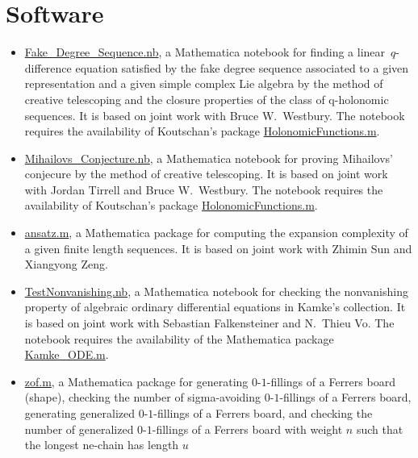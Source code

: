 \documentclass[a4paper,12pt]{article}
\begin{document}
\section*{\Large{Software}}
\begin{itemize}
\item \href{https://yzhang1616.github.io/fd/Fake_Degree_Sequence.nb}{Fake\_Degree\_Sequence.nb},  a Mathematica notebook for finding a linear~$q$-difference equation satisfied by the fake degree sequence associated to a given representation and a given simple complex Lie algebra by the method of creative telescoping and the closure properties of the class of q-holonomic sequences.  It is based on joint work
    with Bruce W.\ Westbury.  The notebook requires the availability of Koutschan's package 
 \href{http://www.risc.jku.at/research/combinat/software/ergosum/RISC/HolonomicFunctions.html}{HolonomicFunctions.m}.
\item \href{https://yzhang1616.github.io/ct/Mihailovs_Conjecture.nb}{Mihailovs\_Conjecture.nb},  a Mathematica notebook for 
proving Mihailovs' conjecure by the method of creative telescoping. It is based on joint work
with Jordan Tirrell and Bruce W.\ Westbury.   The notebook requires the availability of Koutschan's package 
 \href{http://www.risc.jku.at/research/combinat/software/ergosum/RISC/HolonomicFunctions.html}{HolonomicFunctions.m}.
\item \href{https://yzhang1616.github.io/complexity/ansatz.m}{ansatz.m}, 
a Mathematica package for computing the expansion complexity of a given finite length sequences. 
It is based on joint work with Zhimin Sun and Xiangyong Zeng. 
  \item \href{https://yzhang1616.github.io/TestNonvanishing.nb}{TestNonvanishing.nb}, 
    a Mathematica notebook for checking the nonvanishing property of algebraic ordinary
    differential equations in Kamke's collection. It is based on joint work
    with Sebastian Falkensteiner and N.\ Thieu Vo. 
    The notebook requires the availability of the Mathematica package \href{https://yzhang1616.github.io/Kamke_ODE.m}{Kamke\_ODE.m}.
  \item \href{https://yzhang1616.github.io/zof/zof.m}{zof.m}, a Mathematica package for generating $0$-$1$-fillings 
  of a Ferrers board (shape), checking the number of
    sigma-avoiding $0$-$1$-fillings of a Ferrers board, 
     generating generalized $0$-$1$-fillings of a Ferrers board, 
     and checking the number of generalized $0$-$1$-fillings of a Ferrers board with weight $n$
    such that the longest ne-chain has length $u$ 

\end{itemize}
\end{document}
